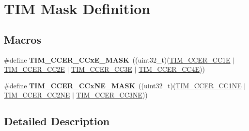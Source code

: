 \hypertarget{group___t_i_m___mask___definitions}{}\section{T\+IM Mask Definition}
\label{group___t_i_m___mask___definitions}
\subsection*{Macros}
\begin{DoxyCompactItemize}
\item 
\mbox{\label{group___t_i_m___mask___definitions_ga5d1a1d755cda12637dfa5143130b4891}} 
\#define {\bfseries T\+I\+M\+\_\+\+C\+C\+E\+R\+\_\+\+C\+Cx\+E\+\_\+\+M\+A\+SK}~((uint32\+\_\+t)(\mbox{\hyperlink{group___peripheral___registers___bits___definition_ga3f494b9881e7b97bb2d79f7ad4e79937}{T\+I\+M\+\_\+\+C\+C\+E\+R\+\_\+\+C\+C1E}} $\vert$ \mbox{\hyperlink{group___peripheral___registers___bits___definition_ga76392a4d63674cd0db0a55762458f16c}{T\+I\+M\+\_\+\+C\+C\+E\+R\+\_\+\+C\+C2E}} $\vert$ \mbox{\hyperlink{group___peripheral___registers___bits___definition_ga1da114e666b61f09cf25f50cdaa7f81f}{T\+I\+M\+\_\+\+C\+C\+E\+R\+\_\+\+C\+C3E}} $\vert$ \mbox{\hyperlink{group___peripheral___registers___bits___definition_ga940b041ab5975311f42f26d314a4b621}{T\+I\+M\+\_\+\+C\+C\+E\+R\+\_\+\+C\+C4E}}))
\item 
\mbox{\label{group___t_i_m___mask___definitions_gaeae61652a005098f9fe6b398d29d4279}} 
\#define {\bfseries T\+I\+M\+\_\+\+C\+C\+E\+R\+\_\+\+C\+Cx\+N\+E\+\_\+\+M\+A\+SK}~((uint32\+\_\+t)(\mbox{\hyperlink{group___peripheral___registers___bits___definition_ga813056b3f90a13c4432aeba55f28957e}{T\+I\+M\+\_\+\+C\+C\+E\+R\+\_\+\+C\+C1\+NE}} $\vert$ \mbox{\hyperlink{group___peripheral___registers___bits___definition_ga6a784649120eddec31998f34323d4156}{T\+I\+M\+\_\+\+C\+C\+E\+R\+\_\+\+C\+C2\+NE}} $\vert$ \mbox{\hyperlink{group___peripheral___registers___bits___definition_gad46cce61d3bd83b64257ba75e54ee1aa}{T\+I\+M\+\_\+\+C\+C\+E\+R\+\_\+\+C\+C3\+NE}}))
\end{DoxyCompactItemize}


\subsection{Detailed Description}
